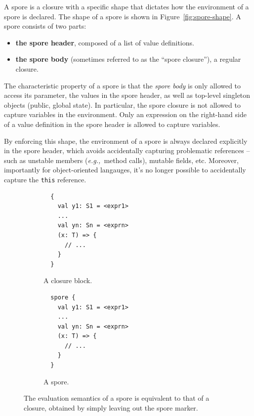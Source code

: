 \documentclass{llncs}
\newcommand{\eg}{{\em e.g.,~}}
\begin{document}
A spore is a closure with a specific shape that dictates how the environment
of a spore is declared. The shape of a spore is shown in Figure~\ref{fig:spore-shape}.
A spore consists of two parts:
\vspace{-1.5mm}
\begin{itemize}
\item {\bf the spore header}, composed of a list of value definitions.
\item {\bf the spore body} (sometimes referred to as the ``spore closure''), a regular closure.
\end{itemize}


The characteristic property
of a spore is that the {\em spore body} is only allowed to access its
parameter, the values in the spore header, as well as top-level singleton objects
(public, global state). In particular, the spore closure is not allowed to
capture variables in the environment. Only an expression on the right-hand
side of a value definition in the spore header is allowed to capture
variables.

By enforcing this shape, the environment of a spore is always declared
explicitly in the spore header, which avoids accidentally capturing
problematic references -- such as unstable members (\eg method calls), mutable
fields, etc. Moreover, importantly for object-oriented langauges, it's no
longer possible to accidentally capture the \verb|this| reference.

\begin{figure}%
\begin{subfigure}{.5\textwidth}
  \centering
  \begin{lstlisting}
  {
    val y1: S1 = <expr1>
    ...
    val yn: Sn = <exprn>
    (x: T) => {
      // ...
    }
  }
  \end{lstlisting}
  \caption{A closure block.}
  \label{fig:normal-block}
\end{subfigure}%
\begin{subfigure}{.5\textwidth}
  \centering
  \begin{lstlisting}
  spore {
    val y1: S1 = <expr1>
    ...
    val yn: Sn = <exprn>
    (x: T) => {
      // ...
    }
  }
  \end{lstlisting}
  \caption{A spore.}
  \label{fig:normal-spore-shape}
\end{subfigure}%
\caption{The evaluation semantics of a spore is equivalent to that of a closure, obtained by simply leaving out the spore marker.}
\label{fig:evaluation-semantics}
\vspace{-5mm}
\end{figure}
\end{document}
